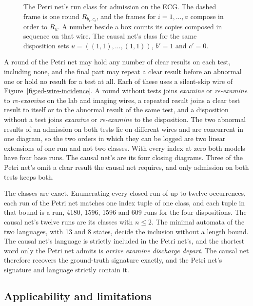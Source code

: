\begin{figure}[tp]
  \centering
  \resizebox{0.9\linewidth}{!}{\unskip}
  \caption{The Petri net's run class for admission on the ECG. The dashed frame is one round
    $R_{b_i,c_i}$, and the frames for $i=1,\dots,a$ compose in order to $R_u$. A number beside a box
    counts its copies composed in sequence on that wire. The causal net's class for the same
    disposition sets $u=((1,1),\dots,(1,1))$, $b'=1$ and $c'=0$.}
  \label{fig:ed-pn-class}
\end{figure}

A round of the Petri net may hold any number
of clear results on each test, including none, and the final part may repeat a clear result before
an abnormal one or hold no result for a test at all. Each of these uses a silent-skip wire of
Figure~\ref{fig:ed-wire-incidence}. A round without tests joins \emph{examine} or \emph{re-examine} to
\emph{re-examine} on the lab and imaging wires, a repeated result joins a clear test result to itself
or to the abnormal result of the same test, and a
disposition without a test joins \emph{examine} or \emph{re-examine} to the disposition. The two
abnormal results of an admission on both tests lie on different wires and are concurrent in one
diagram, so the two orders in which they can be logged are two linear extensions of one run and not
two classes. With every index at zero both models have four base runs. The causal net's are its four
closing diagrams. Three of the Petri net's omit a clear result the causal net requires, and only
admission on both tests keeps both.

The classes are exact. Enumerating every closed run of up to twelve occurrences, each run of the
Petri net matches one index tuple of one class, and each tuple in that bound is a run, 4180, 1596,
1596 and 609 runs for the four dispositions. The causal net's twelve runs are its classes with
$n\leq2$. The minimal automata of the two languages, with 13 and 8 states, decide the inclusion
without a length bound. The causal net's language is strictly included in the Petri net's, and the
shortest word only the Petri net admits is \emph{arrive examine discharge depart}. The causal net
therefore recovers the ground-truth signature exactly, and the Petri net's signature and language
strictly contain it.

\subsection{Applicability and limitations}\label{subsec:threats}

